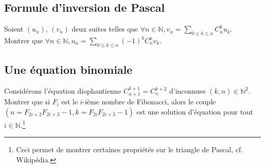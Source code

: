 \documentclass{article}
\begin{document}
\subsection{Formule d'inversion de Pascal}
Soient $(u_n)$, $(v_n)$ deux suites telles que $\forall n\in\mathbb{N}, v_n=\sum\limits_{0\leq k\leq n}C_n^k u_k$.\\
Montrer que $\forall n\in\mathbb{N}, u_n=\sum\limits_{0\leq k \leq n}(-1)^k C_n^k v_k$.

\subsection{Une \'equation binomiale}
Consid\'erons l'\'equation diophantienne $C_{n+1}^{k+1}=C_{n}^{k+2}$ d'inconnues $(k,n)\in\mathbb{N}^2$. Montrer que si $F_i$ est le $i$-i\`eme nombre de Fibonacci, alors le couple $(n=F_{2i+2}F_{2i+3}-1, k=F_{2i}F_{2i+3}-1)$ est une solution d'\'equation pour tout $i\in\mathbb{N}$.\footnote{Ceci permet de montrer certaines propri\'et\'es sur le triangle de Pascal, cf. Wikip\'edia.}\\
\end{document}
